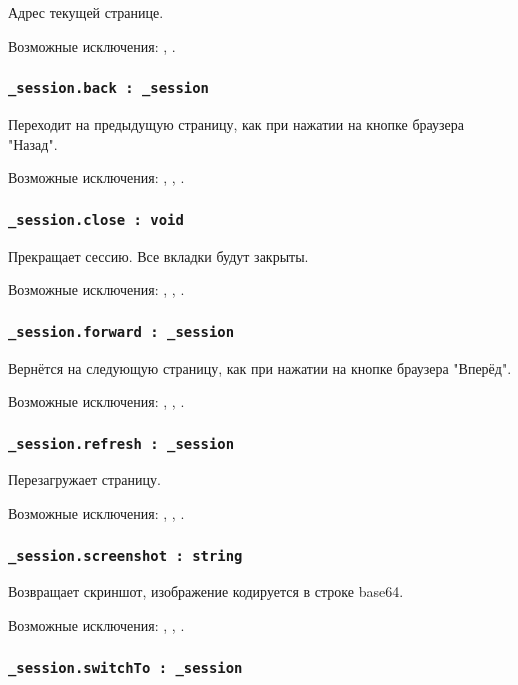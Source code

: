 Адрес текущей странице.

Возможные исключения: , .

\subsubsection{\lstinline|_session.back : _session|}

Переходит на предыдущую страницу, как при нажатии на кнопке браузера "Назад".

Возможные исключения: , , .

\subsubsection{\lstinline|_session.close : void|}

Прекращает сессию. Все вкладки будут закрыты.

Возможные исключения: , , .

\subsubsection{\lstinline|_session.forward : _session|}

Вернётся на следующую страницу, как при нажатии на кнопке браузера "Вперёд".

Возможные исключения: , , .

\subsubsection{\lstinline|_session.refresh : _session|}

Перезагружает страницу.

Возможные исключения: , , .

\subsubsection{\lstinline|_session.screenshot : string|}

Возвращает скриншот, изображение кодируется в строке base64.

Возможные исключения: , , .

\subsubsection{\lstinline|_session.switchTo : _session|}

